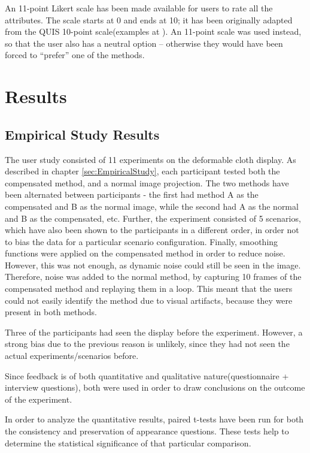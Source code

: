 \documentclass[]{article}
\begin{document}
An 11-point Likert scale has been made available for users to rate all the attributes. The scale starts at 0 and ends at 10; it has been originally adapted from the QUIS 10-point scale(examples at \cite{quis}). An 11-point scale was used instead, so that the user also has a neutral option – otherwise they would have been forced to “prefer” one of the methods.


\newpage
\section{Results}
\label{sec:Results}
\subsection{Empirical Study Results}
\label{sec:Empirical Study Results}
The user study consisted of 11 experiments on the deformable cloth display. As described in chapter \ref{sec:EmpiricalStudy}, each participant tested both the compensated method, and a normal image projection. The two methods have been alternated between participants - the first had method A as the compensated and B as the normal image, while the second had A as the normal and B as the compensated, etc. Further, the experiment consisted of 5 scenarios, which have also been shown to the participants in a different order, in order not to bias the data for a particular scenario configuration. Finally, smoothing functions were applied on the compensated method in order to reduce noise. However, this was not enough, as dynamic noise could still be seen in the image. Therefore, noise was added to the normal method, by capturing 10 frames of the compensated method and replaying them in a loop. This meant that the users could not easily identify the method due to visual artifacts, because they were present in both methods.

Three of the participants had seen the display before the experiment. However, a strong bias due to the previous reason is unlikely, since they had not seen the actual experiments/scenarios before.

Since feedback is of both quantitative and qualitative nature(questionnaire + interview questions), both were used in order to draw conclusions on the outcome of the experiment.

In order to analyze the quantitative results, paired t-tests have been run for both the consistency and preservation of appearance questions. These tests help to determine the statistical significance of that particular comparison.
\end{document}
